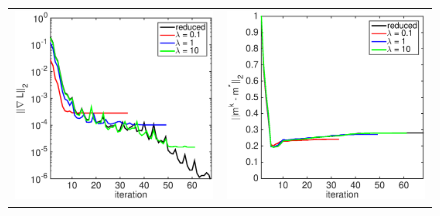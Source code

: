 \documentclass{iopart}
\begin{document}
\begin{figure}
\centering
\begin{tabular}{cc}
\includegraphics[scale=.3]{./figs/2D_exp2_b}&
\includegraphics[scale=.3]{./figs/2D_exp2_c}\\
\end{tabular}

\end{figure}
\end{document}
